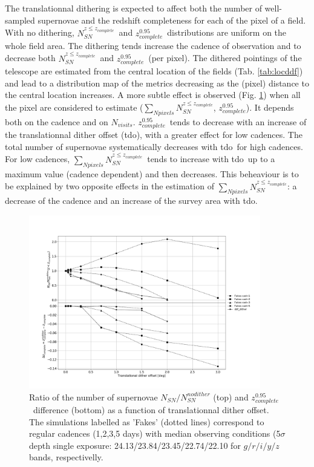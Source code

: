 \documentclass[skiphelvet,twocolumn]{lsstdescnote}
\newcommand{\nsncomp}{{$N_{SN}^{z\leq z_{complete}}$}}
\newcommand{\sumnsncomp}{{$\sum\limits_{Npixels} N_{SN}^{z\leq z_{complete}}$}}
\newcommand{\zcompb}{\mbox{$z_{complete}^{0.95}$}}
\newcommand{\nvisits}{$N_{visits}$}
\newcommand{\doffset}{tdo}
\begin{document}
\par
The translationnal dithering is expected to affect both the number of well-sampled supernovae and the redshift completeness for each of the pixel of a field. With no dithering, \nsncomp~and \zcompb~distributions are uniform on the whole field area. The dithering tends increase the cadence of observation and to decrease both \nsncomp~and \zcompb~(per pixel). The dithered pointings of the telescope are estimated from the central location of the fields (Tab. \ref{tab:locddf}) and lead to a distribution map of the metrics decreasing as the (pixel) distance to the central location increases. A more subtle effect is observed (Fig. \ref{fig:dither}) when all the pixel are considered to estimate (\sumnsncomp, \zcompb). It depends both on the cadence and on \nvisits. \zcompb~tends to decrease with an increase of the translationnal dither offset (\doffset), with a greater effect for low cadences. The total number of supernovae systematically decreases with \doffset~for high cadences. For low cadences, \sumnsncomp~tends to increase with \doffset~up to a maximum value (cadence dependent) and then decreases. This beheaviour is to be explained by two opposite effects in the estimation of \sumnsncomp: a decrease of the cadence and an increase of the survey area with \doffset.

\begin{figure}[htbp]
  \begin{center}
  \includegraphics[width=0.9\textwidth]{dither_ddf.png}
 \caption{Ratio of the number of supernovae $N_{SN}/N_{SN}^{nodither}$ (top) and \zcompb~difference (bottom) as a function of translationnal dither offset. The simulations labelled as 'Fakes' (dotted lines) correspond to regular cadences (1,2,3,5 days) with median observing conditions (5$\sigma$ depth single exposure: 24.13/23.84/23.45/22.74/22.10 for $g/r/i/y/z$ bands, respectivelly.}\label{fig:dither}
\end{center}
\end{figure}
\end{document}
